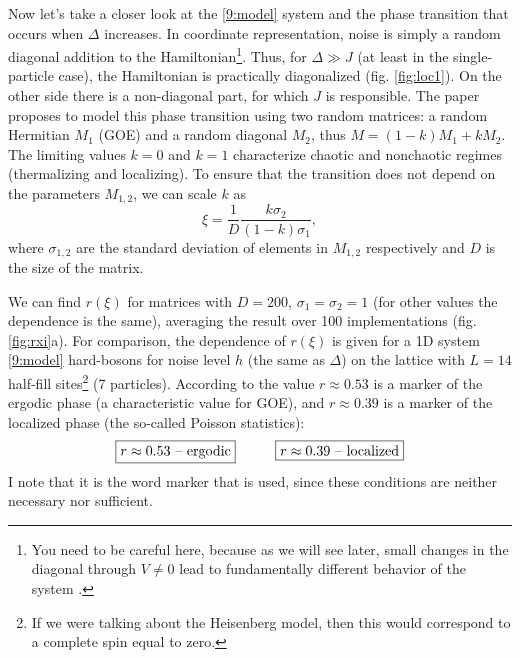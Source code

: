 Now let's take a closer look at the \eqref{9:model} system and the phase transition that occurs when $\Delta$ increases. In coordinate representation, noise is simply a random diagonal addition to the Hamiltonian\footnote{
     You need to be careful here, because as we will see later, small changes in the diagonal through $V \neq 0$ lead to fundamentally different behavior of the system \cite{bardarson_unbounded_2012}.
}. Thus, for $\Delta \gg J$ (at least in the single-particle case), the Hamiltonian is practically diagonalized (fig. \ref{fig:loc1}). On the other side there is a non-diagonal part, for which $J$ is responsible. The paper \cite{wei_characterization_2020} proposes to model this phase transition using two random matrices: a random Hermitian $M_1$ (GOE) and a random diagonal $M_2$, thus $M = (1-k) M_1 + k M_2$. The limiting values $k=0$ and $k=1$ characterize chaotic and nonchaotic regimes (thermalizing and localizing). To ensure that the transition does not depend on the parameters $M_{1,2}$, we can scale $k$ as
\begin{equation*}
     \xi = \frac{1}{D} \frac{k \sigma_2}{(1-k)\sigma_1},
\end{equation*}
where $\sigma_{1,2}$ are the standard deviation of elements in $M_{1,2}$ respectively and $D$ is the size of the matrix.




We can find $r(\xi)$ for matrices with $D=200$, $\sigma_1=\sigma_2=1$ (for other values the dependence is the same), averaging the result over 100 implementations (fig. \ref{fig:rxi}a). For comparison, the dependence of $r(\xi)$ is given for a 1D system \eqref{9:model} hard-bosons for noise level $h$ (the same as $\Delta$) on the lattice with $L=14$ half-fill sites\footnote{
     If we were talking about the Heisenberg model, then this would correspond to a complete spin equal to zero.
} (7 particles). According to \cite{wei_characterization_2020, pal_many-body_2010} the value $r \approx 0.53$ is a marker of the ergodic phase (a characteristic value for GOE), and $r \approx 0.39$ is a marker of the localized phase (the so-called Poisson statistics):
\begin{equation*}
\boxed{
    r \approx 0.53 \text{ -- ergodic}
}
\hspace{10 mm} 
\boxed{
    r \approx 0.39 \text{ -- localized}
}
\end{equation*}
I note that it is the word marker that is used, since these conditions are neither necessary nor sufficient.



